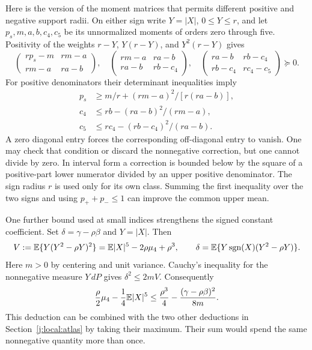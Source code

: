 Here is the version of the moment matrices that permits different
positive and negative support radii. On either sign write $Y=|X|$,
$0\le Y\le r$, and let $p_s,m,a,b,c_4,c_5$ be its unnormalized
moments of orders zero through five. Positivity of the weights
$r-Y$, $Y(r-Y)$, and $Y^2(r-Y)$ gives
\[
 \begin{pmatrix}rp_s-m&rm-a\\rm-a&ra-b\end{pmatrix},\quad
 \begin{pmatrix}rm-a&ra-b\\ra-b&rb-c_4\end{pmatrix},\quad
 \begin{pmatrix}ra-b&rb-c_4\\rb-c_4&rc_4-c_5\end{pmatrix}
 \succeq0.
\]
For positive denominators their determinant inequalities imply
\begin{align*}
 p_s&\ge m/r+(rm-a)^2/[r(ra-b)],\\
 c_4&\le rb-(ra-b)^2/(rm-a),\\
 c_5&\le rc_4-(rb-c_4)^2/(ra-b).
\end{align*}
A zero diagonal entry forces the corresponding off-diagonal entry to
vanish. One may check that condition or discard the nonnegative
correction, but one cannot divide by zero. In interval form a correction
is bounded below by the square of a positive-part lower numerator
divided by an upper positive denominator. The sign radius $r$ is used
only for its own class. Summing the first inequality over the two signs
and using $p_++p_-\le1$ can improve the common upper mean.

One further bound used at small indices strengthens the signed constant
coefficient. Set $\delta=\gamma-\rho\beta$ and $Y=|X|$. Then
\[
 V:=\mathbb E\{Y(Y^2-\rho Y)^2\}
   =\mathbb E|X|^5-2\rho\mu_4+\rho^3,
 \qquad
 \delta=\mathbb E\{Y\operatorname{sgn}(X)(Y^2-\rho Y)\}.
\]
Here $m>0$ by centering and unit variance.
Cauchy's inequality for the nonnegative measure $Y\,dP$ gives
$\delta^2\le2mV$. Consequently
\begin{equation}\label{j:local:ext:weighted-cubic-loss}
 \frac\rho2\mu_4-\frac14\mathbb E|X|^5
 \le\frac{\rho^3}{4}-\frac{(\gamma-\rho\beta)^2}{8m}.
\end{equation}
This deduction can be combined with the two other deductions in
Section~\ref{j:local:atlas} by taking their maximum. Their sum would spend
the same nonnegative quantity more than once.



